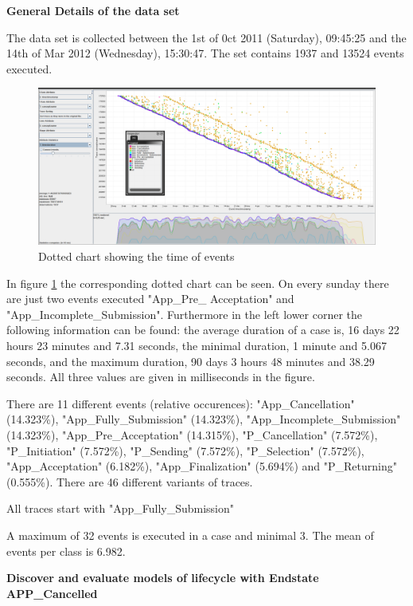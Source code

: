 \textbf{General Details of the data set}

The data set is collected between the 1st of 0ct 2011 (Saturday), 09:45:25 and the 14th of Mar 2012 (Wednesday), 15:30:47. The set contains 1937 and 13524 events executed. 

\begin{figure}[!htbp]
\centering
\includegraphics[height = 0.2\textheight]{CancDot.PNG}
\caption{Dotted chart showing the time of events}
\label{fig:CancTimeFlow}
\end{figure}

In figure \ref{fig:CancTimeFlow} the corresponding dotted chart can be seen. On every sunday there are just two events executed "App\_Pre\_ Acceptation" and "App\_Incomplete\_Submission". Furthermore in the left lower corner the following information can be found: the average duration of a case is, 16 days 22 hours 23 minutes and 7.31 seconds, the minimal duration, 1 minute and 5.067 seconds, and the maximum duration, 90 days 3 hours 48 minutes and 38.29 seconds. All three values are given in milliseconds in the figure.

There are 11 different events (relative occurences):
"App\_Cancellation" (14.323\%), "App\_Fully\_Submission" (14.323\%), "App\_Incomplete\_Submission" (14.323\%), "App\_Pre\_Acceptation" (14.315\%), "P\_Cancellation" (7.572\%), "P\_Initiation" (7.572\%), "P\_Sending" (7.572\%), "P\_Selection" (7.572\%), "App\_Acceptation" (6.182\%), "App\_Finalization" (5.694\%) and "P\_Returning" (0.555\%). There are 46 different variants of traces.

All traces start with "App\_Fully\_Submission"

A maximum of 32 events is executed in a case and minimal 3. The mean of events per class is 6.982.


\textbf{Discover and evaluate models of lifecycle with Endstate APP\_Cancelled}

